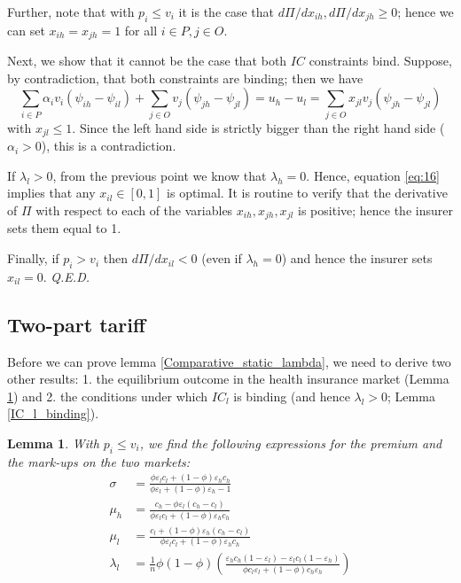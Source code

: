 \documentclass[a4paper,12pt]{article}
\newtheorem{lemma}{Lemma}
\newcommand{\qed}{\hspace*{\fill} {\em Q.E.D.}}
\begin{document}
Further, note that with \(p_i \leq v_i\) it is the case that \(d \Pi/d x_{ih}, d \Pi/d x_{jh} \geq 0\); hence we can set \(x_{ih} = x_{jh} =1\) for all \(i \in P, j \in O\).

Next, we show that it cannot be the case that both \(IC\) constraints bind. Suppose, by contradiction, that both constraints are binding; then we have
\begin{equation}
\label{eq:17}
 \sum_{i \in P} \alpha_i v_i (\psi_{ih}-\psi_{il}) + \sum_{j \in O} v_j (\psi_{jh}-\psi_{jl})  = u_h - u_l = \sum_{j \in O} x_{jl} v_j (\psi_{jh}-\psi_{jl})
\end{equation}
with \(x_{jl} \leq 1\). Since the left hand side is strictly bigger than the right hand side (\(\alpha_i > 0\)), this is a contradiction.


If \(\lambda_l >0\), from the previous point we know that \(\lambda_h = 0\). Hence, equation \eqref{eq:16} implies that any \(x_{il} \in [0,1]\) is optimal. It is routine to verify that the derivative of \(\Pi\) with respect to each of the variables \(x_{ih},x_{jh},x_{jl}\) is positive; hence the insurer sets them equal to 1.

Finally, if \(p_i > v_i\) then \(d\Pi/dx_{il} <0\) (even if \(\lambda_h =0\)) and hence the insurer sets \(x_{il}=0\). 
 \qed


\subsection{Two-part tariff}
\label{sec:org1d1db89}

Before we can prove lemma \ref{Comparative_static_lambda}, we need to derive two other results: 1. the equilibrium outcome in the health insurance market (Lemma \ref{Two_part_tariff}) and 2. the conditions under which \(IC_l\) is binding (and hence \(\lambda_l > 0\); Lemma \ref{IC_l_binding}).

\begin{lemma}
\label{Two_part_tariff}
With \(p_i \leq v_i\), we find the following expressions for the premium and the mark-ups on the two markets:
\begin{align}
\label{eq:29}
\sigma &= \frac{\phi \varepsilon_l c_l +(1-\phi) \varepsilon_h c_h }{\phi \varepsilon_l +(1-\phi) \varepsilon_h-1} \\
\label{eq:29a}
\mu_h &=  \frac{c_h -\phi \varepsilon_l (c_{h}-c_l)}{\phi \varepsilon_lc_l +(1-\phi) \varepsilon_h c_h} \\
\label{eq:29b}
\mu_l &=  \frac{c_l +(1-\phi) \varepsilon_h (c_{h}-c_l)}{\phi \varepsilon_lc_l +(1-\phi) \varepsilon_h c_h} \\
\label{eq:43}
\lambda_l &= \frac{1}{n}\phi(1-\phi) \left( \frac{\varepsilon_h c_h (1-\varepsilon_l) - \varepsilon_l c_l (1-\varepsilon_h)}{\phi c_l\varepsilon_l + (1-\phi) c_h \varepsilon_h} \right)
\end{align}
\end{lemma}
\end{document}
